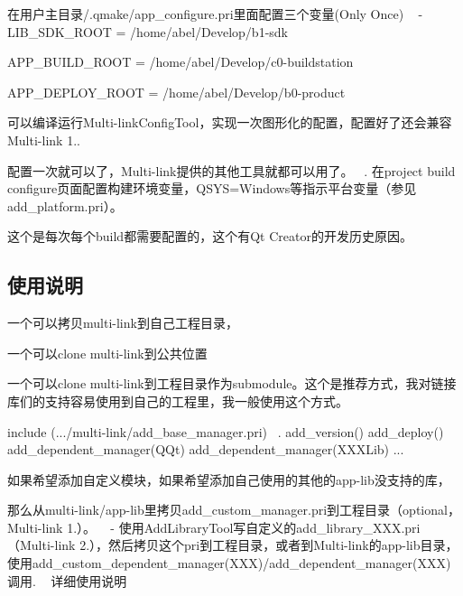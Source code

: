 \begin{DoxyEnumerate}
\item 在用户主目录/.qmake/app\+\_\+configure.\+pri里面配置三个变量(\+Only Once) ~\newline
 -\/ L\+I\+B\+\_\+\+S\+D\+K\+\_\+\+R\+O\+OT = /home/abel/\+Develop/b1-\/sdk
\begin{DoxyItemize}
\item A\+P\+P\+\_\+\+B\+U\+I\+L\+D\+\_\+\+R\+O\+OT = /home/abel/\+Develop/c0-\/buildstation
\item A\+P\+P\+\_\+\+D\+E\+P\+L\+O\+Y\+\_\+\+R\+O\+OT = /home/abel/\+Develop/b0-\/product
\item 可以编译运行\+Multi-\/link\+Config\+Tool，实现一次图形化的配置，配置好了还会兼容\+Multi-\/link 1..
\item 配置一次就可以了，\+Multi-\/link提供的其他工具就都可以用了。 ~. 在project build configure页面配置构建环境变量，\+Q\+S\+YS=Windows等指示平台变量（参见add\+\_\+platform.\+pri）。
\item 这个是每次每个build都需要配置的，这个有\+Qt Creator的开发历史原因。 ~\newline
 \subsection*{使用说明}
\end{DoxyItemize}
\end{DoxyEnumerate}
\begin{DoxyEnumerate}
\item 一个可以拷贝multi-\/link到自己工程目录，
\begin{DoxyItemize}
\item 一个可以clone multi-\/link到公共位置
\item 一个可以clone multi-\/link到工程目录作为submodule。这个是推荐方式，我对链接库们的支持容易使用到自己的工程里，我一般使用这个方式。
\end{DoxyItemize}
\item include (.../multi-\/link/add\+\_\+base\+\_\+manager.pri) ~. add\+\_\+version() add\+\_\+deploy() add\+\_\+dependent\+\_\+manager(\+Q\+Qt) add\+\_\+dependent\+\_\+manager(\+X\+X\+X\+Lib) ...
\item 如果希望添加自定义模块，如果希望添加自己使用的其他的app-\/lib没支持的库，
\begin{DoxyItemize}
\item 那么从multi-\/link/app-\/lib里拷贝add\+\_\+custom\+\_\+manager.pri到工程目录（optional，\+Multi-\/link 1.）。 ~\newline
 -\/ 使用\+Add\+Library\+Tool写自定义的add\+\_\+library\+\_\+\+X\+X\+X.\+pri（\+Multi-\/link 2.），然后拷贝这个pri到工程目录，或者到\+Multi-\/link的app-\/lib目录，使用add\+\_\+custom\+\_\+dependent\+\_\+manager(X\+XX)/add\+\_\+dependent\+\_\+manager(X\+XX)调用. ~\newline
 详细使用说明 ~\newline

\end{DoxyItemize}
\end{DoxyEnumerate}

